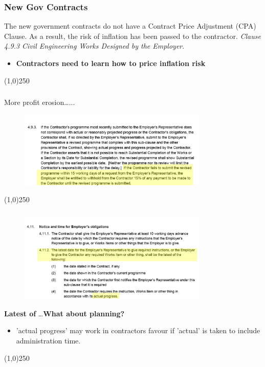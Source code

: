 \begin{frame}
\frametitle{New Gov Contracts}
The new government contracts do not have a Contract Price Adjustment (CPA) Clause.  As a result, the risk of inflation has been passed to the contractor.  \textit{Clause 4.9.3 Civil Engineering Works Designed by the Employer}.
\begin{itemize}
	\item \textbf{Contractors need to learn how to price inflation risk}
\end{itemize}
\end{frame}
\begin{center}\line(1,0){250}\end{center}







\begin{frame}
\frametitle{}
More profit erosion…...
\begin{figure}
 	\centering
 		\includegraphics[width = 9cm]{images/dofsch.jpg}
 	\label{fig:dofsch}
 \end{figure}
\end{frame}
\begin{center}\line(1,0){250}\end{center}







\begin{frame}
\frametitle{}
\begin{figure}
	\centering
		\includegraphics[width = 9cm]{images/dofsch2.jpg}
	\label{fig:dofsch2}
\end{figure}

\textbf{Latest of} \ldots  \textbf{What about planning?}
\begin{itemize}
	\item 'actual progress' may work in contractors favour if 'actual' is taken to include administration time.
\end{itemize}
 
\end{frame}
\begin{center}\line(1,0){250}\end{center}






